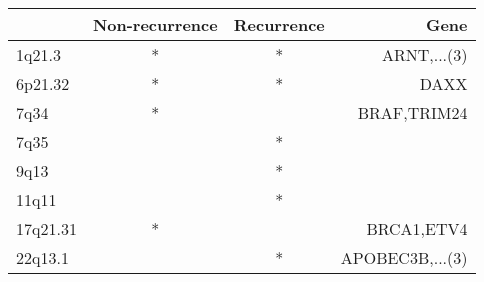 \begin{tabular}{lccr}
\toprule
{} & Non-recurrence & Recurrence &             Gene \\
\midrule
1q21.3   &              * &          * &      ARNT,...(3) \\
6p21.32  &              * &          * &             DAXX \\
7q34     &              * &            &      BRAF,TRIM24 \\
7q35     &                &          * &                  \\
9q13     &                &          * &                  \\
11q11    &                &          * &                  \\
17q21.31 &              * &            &       BRCA1,ETV4 \\
22q13.1  &                &          * &  APOBEC3B,...(3) \\
\bottomrule
\end{tabular}

